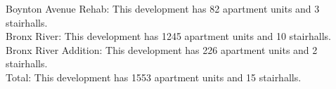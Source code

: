 {Boynton Avenue Rehab}: This development has 82 apartment units and 3 stairhalls.\\{Bronx River}: This development has 1245 apartment units and 10 stairhalls.\\{Bronx River Addition}: This development has 226 apartment units and 2 stairhalls.\\{Total}: This development has 1553 apartment units and 15 stairhalls.\\